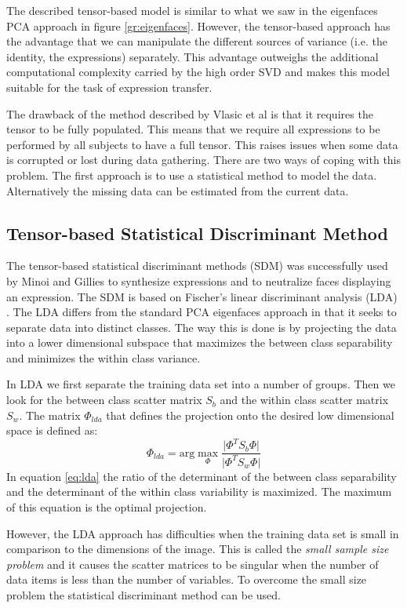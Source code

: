 \documentclass[11pt,a4paper]{report}
\begin{document}
The described tensor-based model is
similar to what we saw in the eigenfaces PCA approach in figure
\ref{gr:eigenfaces}. However, the tensor-based approach has the advantage that
we can manipulate the different sources of variance (i.e. the identity, the
expressions) separately. This advantage outweighs the additional computational
complexity carried by the high order SVD and makes this model suitable for the
task of expression transfer.

The drawback of the method described by Vlasic et al is that it requires the
tensor to be fully populated. This means that we require all
expressions to be performed by all subjects to have a full tensor. This raises
issues when some data is corrupted or lost during data gathering. There are two
ways of coping with this problem. The first approach is to use a
statistical method to model the data. Alternatively the missing data can be estimated from the current data.
\subsection{Tensor-based Statistical Discriminant Method}
The tensor-based statistical discriminant methods (SDM) was successfully used by Minoi and Gillies
\cite{sdm,jacey} to synthesize expressions and to neutralize faces displaying an
expression. The SDM is based on Fischer's linear discriminant analysis (LDA) \cite{lda}. The LDA
differs from the standard PCA eigenfaces approach in that it seeks to separate
data into distinct classes. The way this is done is by projecting the data into
a lower dimensional subspace that maximizes the between class separability and
minimizes the within class variance.

In LDA we first separate the training data set into a number of groups. Then we
look for the between class scatter matrix $S_b$ and the within class scatter
matrix $S_w$. The matrix $\Phi_{lda}$ that defines the projection onto the desired low dimensional
space is defined as:
\begin{equation} \label{eq:lda}
\Phi_{lda} = \textrm{arg} \max_{\Phi}\frac{\lvert \Phi^T S_b \Phi \rvert}{\lvert \Phi^T S_w \Phi \rvert}
\end{equation}
In equation \ref{eq:lda} the ratio of the determinant of the between class
separability and the determinant of the within class variability is
maximized. The maximum of this equation is the optimal projection.

However, the LDA approach has difficulties when the training data set is small
in comparison to the dimensions of the image. This is called the \textit{small
sample size problem} and it causes the scatter matrices to be singular when the
number of data items is less than the number of variables. To overcome the small size problem the statistical discriminant method can be used.
\end{document}
